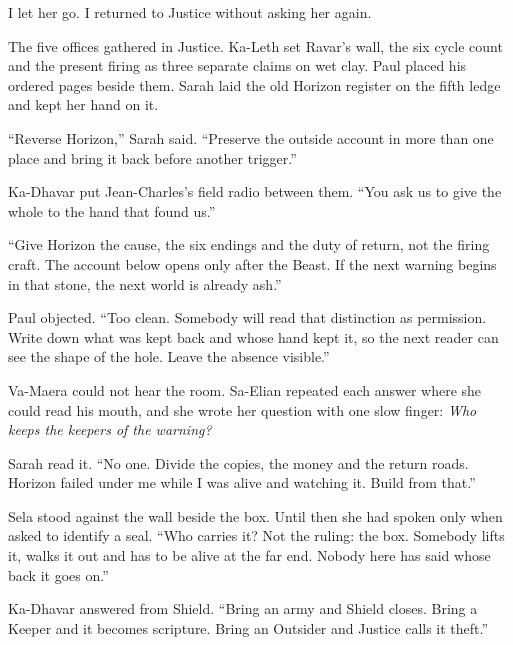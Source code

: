 I let her go. I returned to Justice without asking her again.\par

\ornament

The five offices gathered in Justice. Ka-Leth set Ravar's wall, the six cycle count and the present firing as three separate claims on wet clay. Paul placed his ordered pages beside them. Sarah laid the old Horizon register on the fifth ledge and kept her hand on it.\par

``Reverse Horizon,'' Sarah said. ``Preserve the outside account in more than one place and bring it back before another trigger.''\par

Ka-Dhavar put Jean-Charles's field radio between them. ``You ask us to give the whole to the hand that found us.''\par

``Give Horizon the cause, the six endings and the duty of return, not the firing craft. The account below opens only after the Beast. If the next warning begins in that stone, the next world is already ash.''\par

Paul objected. ``Too clean. Somebody will read that distinction as permission. Write down what was kept back and whose hand kept it, so the next reader can see the shape of the hole. Leave the absence visible.''\par

Va-Maera could not hear the room. Sa-Elian repeated each answer where she could read his mouth, and she wrote her question with one slow finger: \emph{Who keeps the keepers of the warning?}\par

Sarah read it. ``No one. Divide the copies, the money and the return roads. Horizon failed under me while I was alive and watching it. Build from that.''\par

Sela stood against the wall beside the box. Until then she had spoken only when asked to identify a seal. ``Who carries it? Not the ruling: the box. Somebody lifts it, walks it out and has to be alive at the far end. Nobody here has said whose back it goes on.''\par

Ka-Dhavar answered from Shield. ``Bring an army and Shield closes. Bring a Keeper and it becomes scripture. Bring an Outsider and Justice calls it theft.''\par

